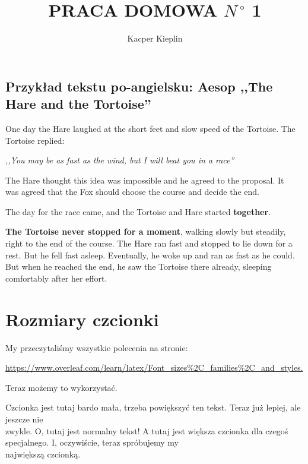 \documentclass[a4paper,11pt]{amsart}
\title{PRACA DOMOWA $N\,^{\circ}\mathrm{}$ 1}
\author{Kacper Kieplin}
\begin{document}
\maketitle
\begin{spacing}{1.4}

\noindent \section{Przykład tekstu po-angielsku: Aesop ,,The Hare and the Tortoise''}
\end{spacing}
\begin{spacing}{1.0}
One day the Hare laughed at the short feet and slow speed of the Tortoise. The
Tortoise replied:

\textit{,,You may be as fast as the wind, but I will beat you in a race''}

The Hare thought this idea was impossible and he agreed to the proposal. It\\
was agreed that the Fox should choose the course and decide the end.

The day for the race came, and the Tortoise and Hare started \textbf{together}.

\textbf{The Tortoise never stopped for a moment}, walking slowly but steadily,
right to the end of the course. The Hare ran fast and stopped to lie down for a rest.
But he fell fast asleep. Eventually, he woke up and ran as fast as he could. But
when he reached the end, he saw the Tortoise there already, sleeping comfortably
after her effort.\\
\end{spacing}

\section{Rozmiary czcionki}


My przeczytaliśmy wszystkie polecenia na stronie:

\url{https://www.overleaf.com/learn/latex/Font_sizes%2C_families%2C_and_styles.}

Teraz możemy to wykorzystać.

{\tiny Czcionka jest tutaj bardo mała, trzeba powiększyć ten tekst.} {\small Teraz już lepiej, ale jeszcze nie\\
zwykle.} O, tutaj jest normalny tekst! {\large A tutaj jest większa czcionka dla czegoś\\
specjalnego.} {\huge I, oczywiście, teraz spróbujemy my\\
największą czcionką.}
\end{document}
